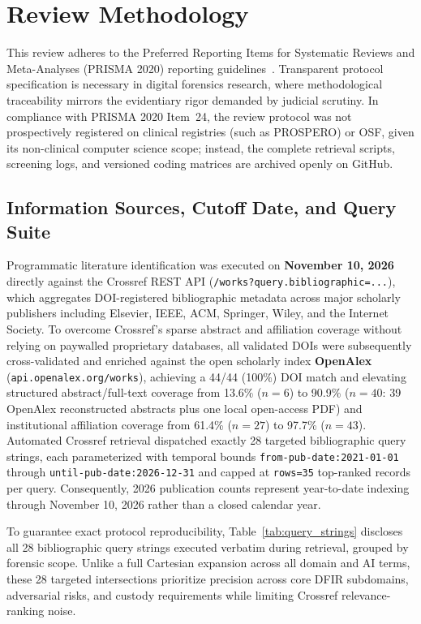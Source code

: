\section{Review Methodology}
\label{sec:methodology}

This review adheres to the Preferred Reporting Items for Systematic Reviews and Meta-Analyses (PRISMA 2020) reporting guidelines~\cite{page2021prisma}. Transparent protocol specification is necessary in digital forensics research, where methodological traceability mirrors the evidentiary rigor demanded by judicial scrutiny. In compliance with PRISMA 2020 Item~24, the review protocol was not prospectively registered on clinical registries (such as PROSPERO) or OSF, given its non-clinical computer science scope; instead, the complete retrieval scripts, screening logs, and versioned coding matrices are archived openly on GitHub.

\subsection{Information Sources, Cutoff Date, and Query Suite}
Programmatic literature identification was executed on \textbf{November 10, 2026} directly against the Crossref REST API (\texttt{/works?query.bibliographic=...}), which aggregates DOI-registered bibliographic metadata across major scholarly publishers including Elsevier, IEEE, ACM, Springer, Wiley, and the Internet Society. To overcome Crossref's sparse abstract and affiliation coverage without relying on paywalled proprietary databases, all validated DOIs were subsequently cross-validated and enriched against the open scholarly index \textbf{OpenAlex} (\texttt{api.openalex.org/works}), achieving a 44/44 (100\%) DOI match and elevating structured abstract/full-text coverage from 13.6\% ($n=6$) to 90.9\% ($n=40$: 39 OpenAlex reconstructed abstracts plus one local open-access PDF) and institutional affiliation coverage from 61.4\% ($n=27$) to 97.7\% ($n=43$). Automated Crossref retrieval dispatched exactly 28 targeted bibliographic query strings, each parameterized with temporal bounds \texttt{from-pub-date:2021-01-01} through \texttt{until-pub-date:2026-12-31} and capped at \texttt{rows=35} top-ranked records per query. Consequently, 2026 publication counts represent year-to-date indexing through November 10, 2026 rather than a closed calendar year.

To guarantee exact protocol reproducibility, Table~\ref{tab:query_strings} discloses all 28 bibliographic query strings executed verbatim during retrieval, grouped by forensic scope. Unlike a full Cartesian expansion across all domain and AI terms, these 28 targeted intersections prioritize precision across core DFIR subdomains, adversarial risks, and custody requirements while limiting Crossref relevance-ranking noise.

